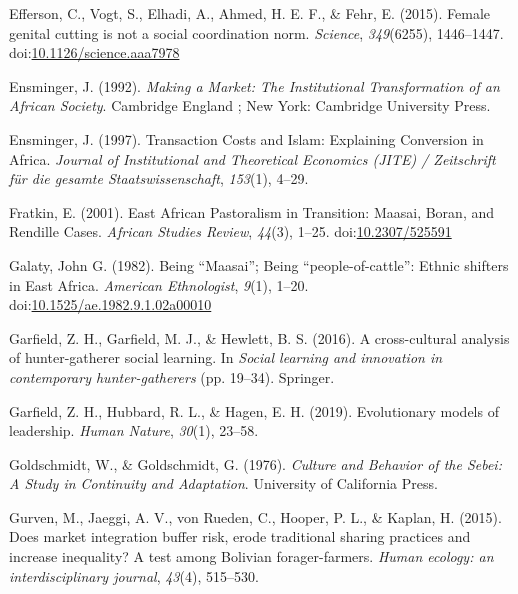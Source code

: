 \documentclass[
  11pt,
]{article}
\begin{document}
\leavevmode\hypertarget{ref-effersonFemaleGenitalCutting2015}{}%
Efferson, C., Vogt, S., Elhadi, A., Ahmed, H. E. F., \& Fehr, E. (2015).
Female genital cutting is not a social coordination norm.
\emph{Science}, \emph{349}(6255), 1446--1447.
doi:\href{https://doi.org/10.1126/science.aaa7978}{10.1126/science.aaa7978}

\leavevmode\hypertarget{ref-ensmingerMakingMarketInstitutional1992}{}%
Ensminger, J. (1992). \emph{Making a Market: The Institutional
Transformation of an African Society}. Cambridge England ; New York:
Cambridge University Press.

\leavevmode\hypertarget{ref-ensmingerTransactionCostsIslam1997}{}%
Ensminger, J. (1997). Transaction Costs and Islam: Explaining Conversion
in Africa. \emph{Journal of Institutional and Theoretical Economics
(JITE) / Zeitschrift für die gesamte Staatswissenschaft}, \emph{153}(1),
4--29.

\leavevmode\hypertarget{ref-fratkinEastAfricanPastoralism2001}{}%
Fratkin, E. (2001). East African Pastoralism in Transition: Maasai,
Boran, and Rendille Cases. \emph{African Studies Review}, \emph{44}(3),
1--25. doi:\href{https://doi.org/10.2307/525591}{10.2307/525591}

\leavevmode\hypertarget{ref-galatyjohngBeingMaasaiBeing1982}{}%
Galaty, John G. (1982). Being ``Maasai''; Being ``people-of-cattle'':
Ethnic shifters in East Africa. \emph{American Ethnologist},
\emph{9}(1), 1--20.
doi:\href{https://doi.org/10.1525/ae.1982.9.1.02a00010}{10.1525/ae.1982.9.1.02a00010}

\leavevmode\hypertarget{ref-garfield2016cross}{}%
Garfield, Z. H., Garfield, M. J., \& Hewlett, B. S. (2016). A
cross-cultural analysis of hunter-gatherer social learning. In
\emph{Social learning and innovation in contemporary hunter-gatherers}
(pp. 19--34). Springer.

\leavevmode\hypertarget{ref-garfield2019evolutionary}{}%
Garfield, Z. H., Hubbard, R. L., \& Hagen, E. H. (2019). Evolutionary
models of leadership. \emph{Human Nature}, \emph{30}(1), 23--58.

\leavevmode\hypertarget{ref-goldschmidtCultureBehaviorSebei1976}{}%
Goldschmidt, W., \& Goldschmidt, G. (1976). \emph{Culture and Behavior
of the Sebei: A Study in Continuity and Adaptation}. University of
California Press.

\leavevmode\hypertarget{ref-gurvenDoesMarketIntegration2015}{}%
Gurven, M., Jaeggi, A. V., von Rueden, C., Hooper, P. L., \& Kaplan, H.
(2015). Does market integration buffer risk, erode traditional sharing
practices and increase inequality? A test among Bolivian
forager-farmers. \emph{Human ecology: an interdisciplinary journal},
\emph{43}(4), 515--530.
\end{document}
